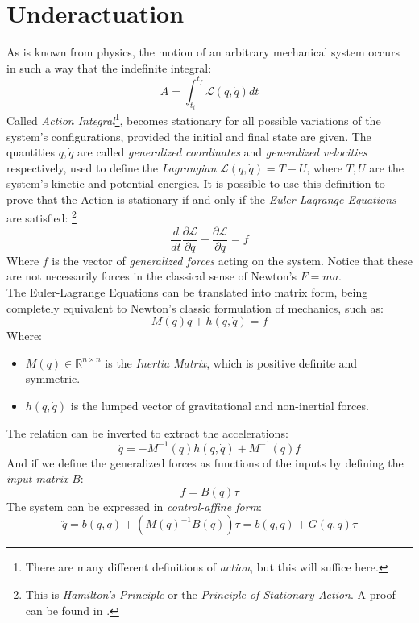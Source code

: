             \section{Underactuation}
            As is known from physics, the motion of an arbitrary mechanical system occurs in such a way that the indefinite integral:
            \[A=\int_{t_i}^{t_f} \mathcal{L}(q,\dot{q})dt\]
            Called \textit{Action Integral}\footnote{There are many different definitions of \textit{action}, but this will suffice here.}, becomes stationary for all possible variations of the system's configurations, provided the initial and final state are given. The quantities $q, \dot{q}$ are called \textit{generalized coordinates} and \textit{generalized velocities} respectively, used to define the \textit{Lagrangian} $\mathcal{L}(q,\dot{q})=T-U$, where $T,U$ are the system's kinetic and potential energies. It is possible to use this definition to prove that the Action is stationary if and only if the \textit{Euler-Lagrange Equations} are satisfied: \footnote{This is \textit{Hamilton's Principle} or the \textit{Principle of Stationary Action}. A proof can be found in \cite{Taylor_ClassicalMechanics}.}
            \[\frac{d}{dt} \frac{\mathcal{\partial L}}{\partial\dot{q}}-\frac{\partial\mathcal{L}}{\partial q}=f\]
            Where $f$ is the vector of \textit{generalized forces} acting on the system. Notice that these are not necessarily forces in the classical sense of Newton's $F=ma$. \\
            The Euler-Lagrange Equations can be translated into matrix form, being completely equivalent to Newton's classic formulation of mechanics, such as:
            \[M(q)\ddot{q}+h(q,\dot{q})=f\]
            Where:
            \begin{itemize}
                \item $M(q) \in \mathbb{R}^{n \times n}$ is the \textit{Inertia Matrix}, which is positive definite and symmetric.
                \item $h(q,\dot{q})$ is the lumped vector of gravitational and non-inertial forces.
            \end{itemize}
            The relation can be inverted to extract the accelerations:
            \[\ddot{q}=-M^{-1}(q)h(q,\dot{q})+M^{-1}(q)f\]
            And if we define the generalized forces as functions of the inputs by defining the \textit{input matrix} $B$:
            \[f=B(q)\tau\]
            The system can be expressed in \textit{control-affine form}:
            \begin{equation}\label{control_affine_motion}
                \ddot{q}=b(q,\dot{q})+(M(q)^{-1}B(q))\tau=b(q,\dot{q})+G(q,\dot{q})\tau               
            \end{equation}
